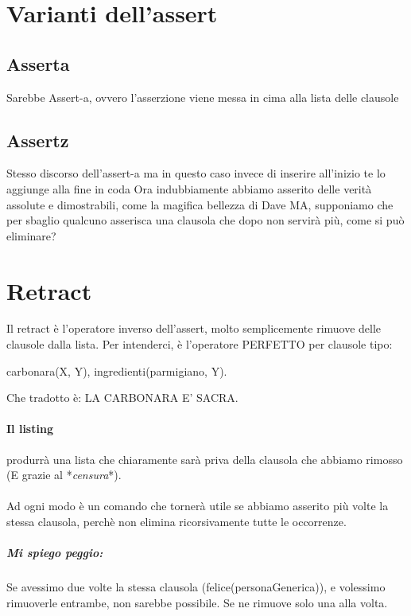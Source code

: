 \documentclass[12pt, a4paper, openany, oneside]{book}
\begin{document}
\section{Varianti dell'assert}
\subsection{Asserta}
Sarebbe Assert-a, ovvero l'asserzione viene messa in cima alla lista delle 
clausole
\subsection{Assertz}
Stesso discorso dell'assert-a ma in questo caso invece di inserire all'inizio
te lo aggiunge alla fine in coda
Ora indubbiamente abbiamo asserito delle verità assolute e dimostrabili, come
la magifica bellezza di Dave MA, supponiamo che per sbaglio qualcuno asserisca
una clausola che dopo non servirà più, come si può eliminare? 
\section{Retract}
Il retract è l'operatore inverso dell'assert, molto semplicemente rimuove delle
clausole dalla lista. Per intenderci, è l'operatore PERFETTO per clausole tipo:
\begin{center}
carbonara(X, Y), ingredienti(parmigiano, Y). 
\end{center}
Che tradotto è: LA CARBONARA E' SACRA.
\paragraph{Il listing} produrrà una lista che chiaramente sarà priva della 
clausola che abbiamo rimosso (E grazie al *\textit{censura}*). \\ \\
Ad ogni modo è un comando che tornerà utile se abbiamo asserito più volte
la stessa clausola, perchè non elimina ricorsivamente tutte le occorrenze.
\subparagraph{Mi spiego peggio: }Se avessimo due volte la stessa clausola 
(felice(personaGenerica)), e volessimo rimuoverle entrambe, non sarebbe possibile.
Se ne rimuove solo una alla volta.
%
\end{document}
